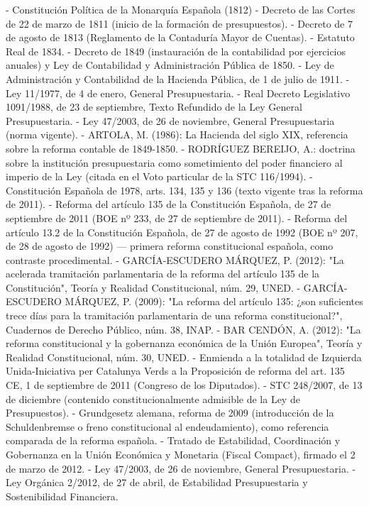 \documentclass[10pt,a4paper]{article}
\begin{document}
- Constitución Política de la Monarquía Española (1812)
- Decreto de las Cortes de 22 de marzo de 1811 (inicio de la formación de presupuestos).
- Decreto de 7 de agosto de 1813 (Reglamento de la Contaduría Mayor de Cuentas).
- Estatuto Real de 1834.
- Decreto de 1849 (instauración de la contabilidad por ejercicios anuales) y Ley de Contabilidad y Administración Pública de 1850.
- Ley de Administración y Contabilidad de la Hacienda Pública, de 1 de julio de 1911.
- Ley 11/1977, de 4 de enero, General Presupuestaria.
- Real Decreto Legislativo 1091/1988, de 23 de septiembre, Texto Refundido de la Ley General Presupuestaria.
- Ley 47/2003, de 26 de noviembre, General Presupuestaria (norma vigente).
- ARTOLA, M. (1986): La Hacienda del siglo XIX, referencia sobre la reforma contable de 1849-1850.
- RODRÍGUEZ BEREIJO, A.: doctrina sobre la institución presupuestaria como sometimiento del poder financiero al imperio de la Ley (citada en el Voto particular de la STC 116/1994).
- Constitución Española de 1978, arts. 134, 135 y 136 (texto vigente tras la reforma de 2011).
- Reforma del artículo 135 de la Constitución Española, de 27 de septiembre de 2011 (BOE nº 233, de 27 de septiembre de 2011).
- Reforma del artículo 13.2 de la Constitución Española, de 27 de agosto de 1992 (BOE nº 207, de 28 de agosto de 1992) — primera reforma constitucional española, como contraste procedimental.
- GARCÍA-ESCUDERO MÁRQUEZ, P. (2012): "La acelerada tramitación parlamentaria de la reforma del artículo 135 de la Constitución", Teoría y Realidad Constitucional, núm. 29, UNED.
- GARCÍA-ESCUDERO MÁRQUEZ, P. (2009): "La reforma del artículo 135: ¿son suficientes trece días para la tramitación parlamentaria de una reforma constitucional?", Cuadernos de Derecho Público, núm. 38, INAP.
- BAR CENDÓN, A. (2012): "La reforma constitucional y la gobernanza económica de la Unión Europea", Teoría y Realidad Constitucional, núm. 30, UNED.
- Enmienda a la totalidad de Izquierda Unida-Iniciativa per Catalunya Verds a la Proposición de reforma del art. 135 CE, 1 de septiembre de 2011 (Congreso de los Diputados).
- STC 248/2007, de 13 de diciembre (contenido constitucionalmente admisible de la Ley de Presupuestos).
- Grundgesetz alemana, reforma de 2009 (introducción de la Schuldenbremse o freno constitucional al endeudamiento), como referencia comparada de la reforma española.
- Tratado de Estabilidad, Coordinación y Gobernanza en la Unión Económica y Monetaria (Fiscal Compact), firmado el 2 de marzo de 2012.
- Ley 47/2003, de 26 de noviembre, General Presupuestaria.
- Ley Orgánica 2/2012, de 27 de abril, de Estabilidad Presupuestaria y Sostenibilidad Financiera.
\end{document}
